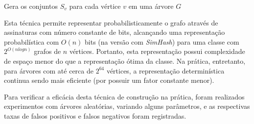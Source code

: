 \begin{algorithm}
\linespread{1}\selectfont
\caption{Gera os conjuntos $S_v$ para cada vértice $v$ em uma árvore $G$}
\label{alg:graphs:treemain}
\begin{algorithmic}[1]

    \For{$j \in [0, q/2)$}
    \EndFor
\EndFunction


    
    
        \Else
        \EndIf
    \EndFor
\EndProcedure

\EndProcedure
\end{algorithmic}
\end{algorithm}

Esta técnica permite representar probabilisticamente o grafo através de assinaturas com número constante de bits, alcançando uma representação probabilística com $O(n)$ bits (na versão com \emph{SimHash}) para uma classe com $2^{O(n log n)}$ grafos de $n$ vértices. Portanto, esta representação possui complexidade de espaço menor do que a representação ótima da classe. Na prática, entretanto, para árvores com até cerca de $2^{64}$ vértices, a representação determinística continua sendo mais eficiente (por possuir um fator constante menor).

Para verificar a eficácia desta técnica de construção na prática, foram realizados experimentos com árvores aleatórias, variando alguns parâmetros, e as respectivas taxas de falsos positivos e falsos negativos foram registradas.

